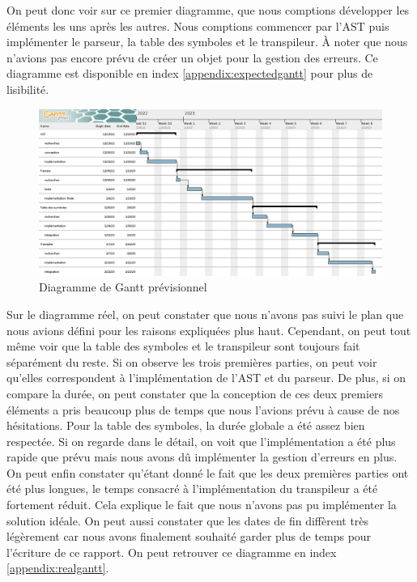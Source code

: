 \documentclass[a4paper]{article}%
\begin{document}
On peut donc voir sur ce premier diagramme, que nous comptions développer les
éléments les uns après les autres. Nous comptions commencer par l'AST puis
implémenter le parseur, la table des symboles et le transpileur. À noter que
nous n'avions pas encore prévu de créer un objet pour la gestion des erreurs.
Ce diagramme est disponible en index \ref{appendix:expectedgantt} pour plus de
lisibilité.

\begin{figure}[h!]
  \begin{center}
  \includegraphics[scale=0.35]{./img/expected-gantt.png}
  \caption{Diagramme de Gantt prévisionnel}
  \end{center}
\end{figure}

Sur le diagramme réel, on peut constater que nous n'avons pas suivi le plan que
nous avions défini pour les raisons expliquées plus haut. Cependant, on peut
tout même voir que la table des symboles et le transpileur sont toujours fait
séparément du reste. Si on observe les trois premières parties, on peut voir
qu'elles correspondent à l'implémentation de l'AST et du parseur. De plus, si on
compare la durée, on peut constater que la conception de ces deux premiers
éléments a pris beaucoup plus de temps que nous l'avions prévu à cause de nos
hésitations. Pour la table des symboles, la durée globale a été assez bien
respectée. Si on regarde dans le détail, on voit que l'implémentation a été plus
rapide que prévu mais nous avons dû implémenter la gestion d'erreurs en plus.
On peut enfin constater qu'étant donné le fait que les deux premières parties
ont été plus longues, le temps consacré à l'implémentation du transpileur a été
fortement réduit. Cela explique le fait que nous n'avons pas pu implémenter la
solution idéale. On peut aussi constater que les dates de fin diffèrent très
légèrement car nous avons finalement souhaité garder plus de temps pour
l'écriture de ce rapport. On peut retrouver ce diagramme en index
\ref{appendix:realgantt}.
\end{document}
